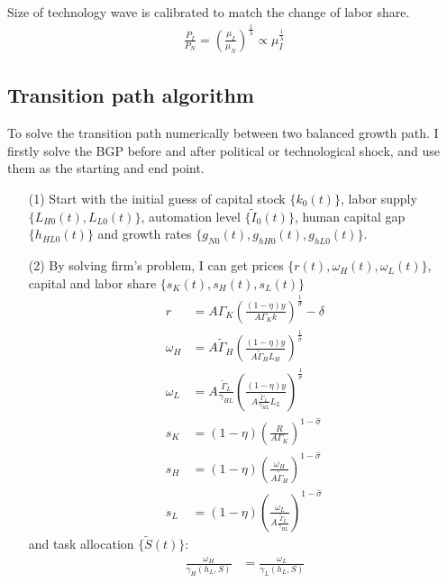 \documentclass[12pt]{article}
\begin{document}
Size of technology wave is calibrated to match the change of labor share. 
\begin{align*}
\frac{P_I}{P_N} =(\frac{\mu_I}{\mu_N})^{\frac{1}{\lambda}} \propto \mu_I^{\frac{1}{\lambda}}
\end{align*}




\subsection*{Transition path algorithm}

To solve the transition path numerically between two balanced growth path. I firstly solve the BGP before and after political or technological shock, and use them as the starting and end point. 

\begin{itemize}
\item[(1)] Start with the initial guess of capital stock $\{k_0(t)\}$, labor supply $\{L_{H0}(t), L_{L0}(t)\}$, automation level $\{\tilde{I}_0(t)\}$, human capital gap $\{h_{HL0}(t)\}$ and growth rates $\{g_{N0}(t),g_{hH0}(t),g_{hL0}(t)\}$. 


\item[(2)] By solving firm's problem, I can get prices $\{r(t),\omega_H(t),\omega_L(t)\}$, capital and labor share $\{s_K(t),s_H(t),s_L(t)\}$
\begin{align*}
r &= A \Gamma_K(\frac{(1-\eta)y}{A\Gamma_Kk})^{\frac{1}{\hat{\sigma}}}-\delta \\
\omega_H &= A \tilde{\Gamma}_H(\frac{(1-\eta)y}{A\tilde{\Gamma}_HL_H})^{\frac{1}{\hat{\sigma}}} \\
\omega_L &= A \frac{\tilde{\Gamma}_L}{\gamma_{HL}}(\frac{(1-\eta)y}{A\frac{\tilde{\Gamma}_L}{\gamma_{HL}}L_L})^{\frac{1}{\hat{\sigma}}} \\
s_K &= (1-\eta)(\frac{R}{A\Gamma_K})^{1-\hat{\sigma}} \\
s_H &= (1-\eta)(\frac{\omega_H}{A \tilde{\Gamma}_H})^{1-\hat{\sigma}} \\
s_L &= (1-\eta)(\frac{\omega_L}{A \frac{\tilde{\Gamma}_L}{\gamma_{HL}}})^{1-\hat{\sigma}} 
\end{align*}
and task allocation $\{\tilde{S}(t)\}$: 
\begin{align*}
\frac{\omega_H}{\gamma_H(h_L,S)} &= \frac{\omega_L}{\gamma_L(h_L,S)}
\end{align*}


\end{itemize}
\end{document}
